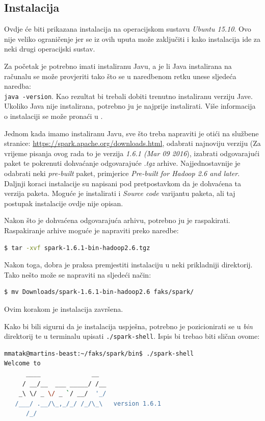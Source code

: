 \documentclass[times, utf8, zavrsni, numeric]{fer}
\begin{document}
\newpage
\begin{appendices}
\chapter{Instalacija}
\label{ch:instalacijaSpark}
Ovdje će biti prikazana instalacija na operacijskom sustavu \emph{Ubuntu 15.10}. Ovo nije veliko ograničenje jer se iz ovih uputa može zaključiti i kako instalacija ide za neki drugi operacijski sustav.

Za početak je potrebno imati instaliranu Javu, a je li Java instalirana na računalu se može provjeriti tako što se u naredbenom retku unese sljedeća naredba:\\
\texttt{java -version}. Kao rezultat bi trebali dobiti trenutno instaliranu verziju Jave. Ukoliko Java nije instalirana, potrebno ju je najprije instalirati. Više informacija o instalaciji se može pronaći u \cite{marcupic}.

Jednom kada imamo instaliranu Javu, sve što treba napraviti je otići na službene stranice: \url{https://spark.apache.org/downloads.html}, odabrati najnoviju verziju (Za vrijeme pisanja ovog rada to je verzija \emph{1.6.1 (Mar 09 2016}), izabrati odgovarajući paket te pokrenuti dohvaćanje odgovarajuće \emph{.tgz} arhive. Najjednostavnije je odabrati neki \emph{pre-built} paket, primjerice \emph{Pre-built for Hadoop 2.6 and later}. Daljnji koraci instalacije su napisani pod pretpostavkom da je dohvaćena ta verzija paketa. Moguće je instalirati i \emph{Source code} varijantu paketa, ali taj postupak instalacije ovdje nije opisan. 

Nakon što je dohvaćena odgovarajuća arhivu, potrebno ju je raspakirati.\\ Raspakiranje arhive moguće je napraviti preko naredbe:
\begin{lstlisting}[language=bash]
$ tar -xvf spark-1.6.1-bin-hadoop2.6.tgz
\end{lstlisting}
Nakon toga, dobra je praksa premjestiti instalaciju u neki prikladniji direktorij. Tako nešto može se napraviti na sljedeći način:
\begin{lstlisting}[language=bash]
$ mv Downloads/spark-1.6.1-bin-hadoop2.6 faks/spark/
\end{lstlisting}
Ovim korakom je instalacija završena. 

Kako bi bili sigurni da je instalacija uspješna, potrebno je pozicionirati se u \emph{bin} direktorij te u terminalu upisati \texttt{./spark-shell}. Ispis bi trebao biti sličan ovome:\\
\begin{lstlisting}[language=bash]
mmatak@martins-beast:~/faks/spark/bin$ ./spark-shell
Welcome to
      ____              __
     / __/__  ___ _____/ /__
    _\ \/ _ \/ _ `/ __/  '_/
   /___/ .__/\_,_/_/ /_/\_\   version 1.6.1
      /_/


\end{lstlisting}
\end{appendices}
\end{document}
